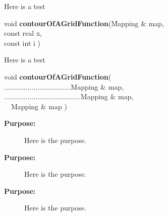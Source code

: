 \documentclass{article}
\begin{document}
Here is a test
\begin{tabbing}
void {\bf contourOfAGridFunction}(\=Mapping \& map, \\
\>const real x,  \\
\>const int i ) 
\end{tabbing}
Here is a test

\begin{flushleft}
void {\bf contourOfAGridFunction}( \\
..................................Mapping \& map, \\
.......................................Mapping \& map, \\
\,\,\,\,\,\,Mapping \& map )
\end{flushleft}

\begin{description}
 \item[{\bf Purpose:}] Here is the purpose.
 \item[{\bf Purpose:}] Here is the purpose.
 \item[{\bf Purpose:}] Here is the purpose.
\end{description}
\end{document}
